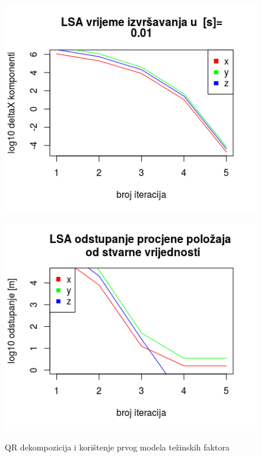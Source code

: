 \documentclass[a4paper,twoside,12pt]{memoir} %
\begin{document}
\begin{figure}[H]
	\begin{minipage}{0.45\textwidth}
		\centering
		\includegraphics[width=1\textwidth]{3LSAdelta1l10QRb}
		\label{fig:3LSAdelta1l10QR}
	\end{minipage}%
	\hspace{1cm}
	\begin{minipage}{0.45\textwidth}
		
		\includegraphics[width=1\textwidth]{3LSAreal1l10QRb}
		\label{fig:3LSAreal1l10QR}
	\end{minipage}%
	\caption{QR dekompozicija i korištenje prvog modela težinskih faktora}
	\label{fig:3LSA1l10QR}
\end{figure}
\end{document}
